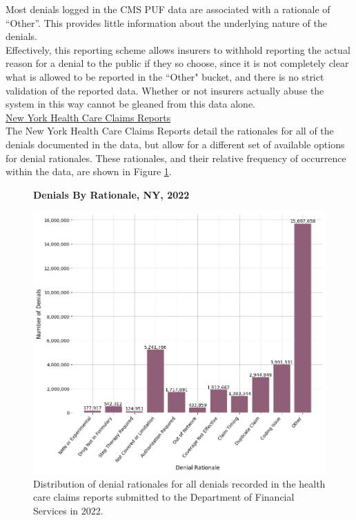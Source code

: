 \documentclass[12pt, a4paper,twoside]{report}
\theoremstyle{plain} %
\theoremstyle{definition} %
\theoremstyle{remark} %
\numberwithin{equation}{chapter}
\begin{document}
		Most denials logged in the CMS PUF data are associated with a rationale of ``Other''. This provides little information about the underlying nature of the denials.\\
		
		Effectively, this reporting scheme allows insurers to withhold reporting the actual reason for a denial to the public if they so choose, since it is not completely clear what is allowed to be reported in the ``Other" bucket, and there is no strict validation of the reported data. Whether or not insurers actually abuse the system in this way cannot be gleaned from this data alone.\\
		
		\underline{New York Health Care Claims Reports}\\
		
		The New York Health Care Claims Reports detail the rationales for all of the denials documented in the data, but allow for a different set of available options for denial rationales. These rationales, and their relative frequency of occurrence within the data, are shown in Figure \ref{nyrationaledist}.\\ 
		
		\begin{figure}[h!]
			\centering
			\textbf{Denials By Rationale, NY, 2022}\par\medskip
			\includegraphics[width=\columnwidth]{images/ny_claim_reports/denial_rationale_dist.png}
			\caption{Distribution of denial rationales for all denials recorded in the health care claims reports submitted to the Department of Financial Services in 2022.}
			\label{nyrationaledist}
		\end{figure}
	
\end{document}
